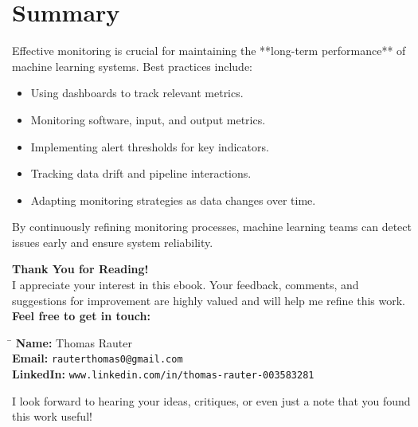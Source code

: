 \documentclass[12pt,openany]{book}
\begin{document}
\section{Summary}

Effective monitoring is crucial for maintaining the **long-term performance** of machine learning systems. Best practices include:

\begin{itemize}
    \item Using dashboards to track relevant metrics.
    \item Monitoring software, input, and output metrics.
    \item Implementing alert thresholds for key indicators.
    \item Tracking data drift and pipeline interactions.
    \item Adapting monitoring strategies as data changes over time.
\end{itemize}

By continuously refining monitoring processes, machine learning teams can detect issues early and ensure system reliability.

\newpage
\thispagestyle{empty}

\begin{center}
    \vspace*{\fill}
    \Large{\textbf{Thank You for Reading!}}\\[1cm]
    \normalsize{
        I appreciate your interest in this ebook. Your feedback, comments, and suggestions for improvement are highly valued and will help me refine this work.
    }\\[0.5cm]
    \textbf{Feel free to get in touch:}\\[0.5cm]
    \begin{tabbing}
        \hspace{3cm} \= \hspace{6cm} \kill
        \textbf{Name:} \> Thomas Rauter \\
        \textbf{Email:} \> \texttt{rauterthomas0@gmail.com} \\
        \textbf{LinkedIn:} \> \texttt{www.linkedin.com/in/thomas-rauter-003583281} \\
    \end{tabbing}
    \normalsize{
        I look forward to hearing your ideas, critiques, or even just a note that you found this work useful!
    }
    \\[1cm]
    \vspace*{\fill}
\end{center}
\end{document}
